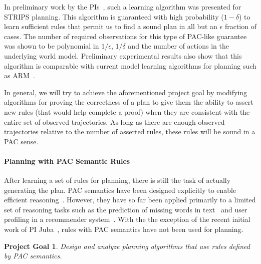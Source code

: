 \documentclass[12pt]{article}
\newtheorem{problem}{Project Goal}
\begin{document}
In preliminary work by the PIs~\cite{stern2017efficientAndSafe}, such a learning algorithm was presented for STRIPS planning. This algorithm is guaranteed with high probability ($1-\delta$)  to learn sufficient rules that permit us to find a sound plan in all but an $\epsilon$ fraction of cases. The number of required observations for this type of PAC-like guarantee was shown to be polynomial in $1/\epsilon$, $1/\delta$ and the number of actions in the underlying world model. Preliminary experimental results also show that this algorithm is comparable with current model learning algorithms for planning such as ARM~\cite{yang2007learning}. 


In general, we will try to achieve the aforementioned project goal by modifying algorithms for proving the correctness of a plan to give them the ability to assert new rules (that would help complete a proof) when they are consistent with the entire set of observed trajectories. As long as there are enough observed trajectories relative to the number of asserted rules, these rules will be sound in a PAC sense. 




\paragraph{Planning with PAC Semantic Rules}


After learning a set of rules for planning, there is still the task of actually generating the plan. PAC semantics have been designed explicitly to enable efficient reasoning~\cite{valiant2000robustLogics}. However, they have so far been applied primarily to a limited set of reasoning tasks such as the prediction of missing words in text~\cite{michael2008first} and user profiling in a recommender system~\cite{semeraro2009knowledge}. With the the exception of the recent initial work of PI Juba~\cite{juba2016jmlr}, rules with PAC semantics have not been used for planning. %
\begin{problem}
Design and analyze planning algorithms that use rules defined by PAC semantics.
\end{problem}

\end{document}
